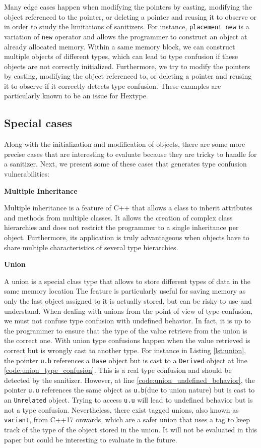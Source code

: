\documentclass[a4paper,11pt,oneside]{report}
\begin{document}
\noindent{}Many edge cases happen when modifying the pointers by casting,
modifying the object referenced to the pointer, or deleting a pointer and
reusing it to observe or in order to study the limitations of sanitizers. For
instance, \texttt{placement new} is a variation of \texttt{new} operator and 
allows the programmer to construct an
object at already allocated memory.  Within a same memory block, we can
construct multiple objects of different types, which can lead to type confusion
if these objects are not correctly initialized. Furthermore, we try to modify the
pointers by casting, modifying the object referenced to, or deleting a pointer
and reusing it to observe if it correctly detects type confusion. These examples
are particularly known to be an issue for Hextype.

\subsection{Special cases}

Along with the initialization and modification of objects, there are some 
more precise cases that are interesting to evaluate because they are 
tricky to handle for a sanitizer. Next, we present some of these cases that 
generates type confusion vulnerabilities:

\textbf{Multiple Inheritance}

\noindent{}Multiple inheritance is a feature of C++ that allows a class to
inherit attributes and methods from multiple classes. It allows the creation of
complex class hierarchies and does not restrict the programmer to a single
inheritance per object. Furthermore, its application is truly advantageous when
objects have to share multiple characteristics of several type hierarchies. 

\textbf{Union}

\noindent{}A union is a special class type that allows to store different types
of data in the same memory location The feature is particularly useful for
saving memory as only the last object assigned to it is actually stored, but can
be risky to use and understand. When dealing with unions from the point of
view of type confusion, we must not confuse type confusion with undefined
behavior. In fact, it is up to the programmer to ensure that
the type of the value retrieve from the union is the correct one. With union type
confusions happen when the value retrieved is correct but is wrongly cast to
another type. For instance in Listing \autoref{lst:union}, the pointer
\texttt{u.b} references a \texttt{Base} object but is cast to a \texttt{Derived}
object at line \ref{code:union_type_confusion}.  This is a real type confusion and
should be detected by the sanitizer. However, at line
\ref{code:union_undefined_behavior}, the pointer \texttt{u.u} references the
same object as \texttt{u.b}(due to union nature) but is cast to an
\texttt{Unrelated} object.  Trying to access \texttt{u.u} will lead to undefined
behavior but is not a type confusion. Nevertheless, there exist tagged unions,
also known as \texttt{variant}, from C++17 onwards, which are a safer union that
uses a tag to keep track of the type of the object stored in the union. It will
not be evaluated in this paper but could be interesting to evaluate in the future.
\end{document}
